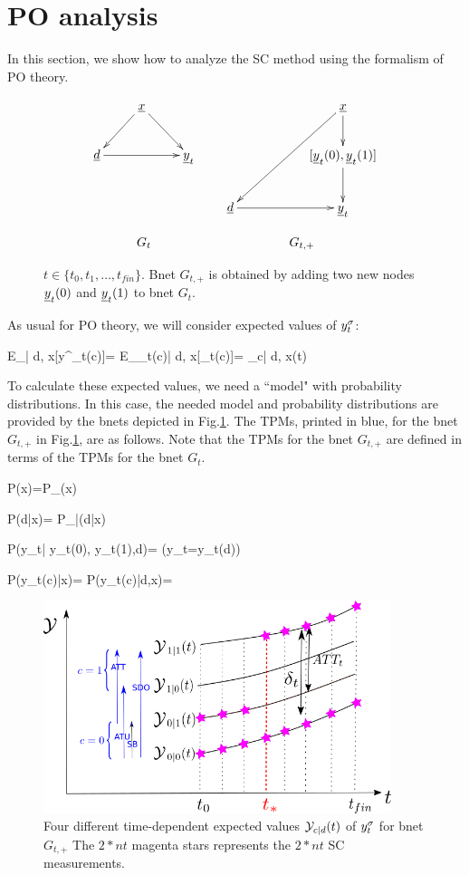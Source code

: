 \section{PO analysis}
In this section,
we show how
to analyze the
SC method
using the formalism of PO theory.



\begin{figure}[h!]
$$
\begin{array}{ccccc}
\xymatrix{
&\rvx\ar[dl]\ar[dr]
\\
\rvd\ar[rr]&&\rvy_t
}
&&
\xymatrix{
&&\rvx\ar[d]\ar[ddll]
\\
&&[\rvy_t(0), \rvy_t(1)]
\ar[d]
\\
\rvd\ar[rr]
&&\rvy_t
}
\\
\\
G_t&&G_{t, +}
\end{array}
$$
\caption{$t\in \{t_0, t_1, \ldots, 
t_{fin}\}$.
Bnet 
$G_{t,+}$
is obtained 
by adding
two new nodes
${\underline{y}}_t(0)$
and ${\underline{y}}_t(1)$ to bnet $G_t$.}
\label{fig-syn-con-G-+}
\end{figure}

As usual for PO theory,
we will consider
expected values of $y^\sigma_t$:


\beq
E_{\s| d, x}[y^\s_t(c)]=
 E_{\rvy_t(c)| d, x}[\rvy_t(c)]=
\caly_{c| d, x}(t)
\eeq

To calculate these
expected values, we need a ``model"
with probability 
distributions.
In this case,
the needed model and probability
distributions are
provided by the
bnets depicted in Fig.\ref{fig-syn-con-G-+}.
The TPMs,
printed in blue,
for the 
 bnet
$G_{t, +}$
in Fig.\ref{fig-syn-con-G-+},
are as follows.
Note
that the
TPMs for the bnet $G_{t, +}$
are defined in 
terms
of the TPMs for the bnet $G_t$.



\beq\color{blue}
P(x)=P_{\rvx}(x)
\eeq

\beq\color{blue}
P(d|x)= 
P_{\rvd|\rvx}(d|x)
\eeq
 
\beq\color{blue}
P(y_t| y_t(0), y_t(1),d)=
\indi(y_t=y_t(d))
\eeq

\beq\color{blue}
P(y_t(c)|x)=
P(y_t(c)|d,x)=
\eeq

\begin{figure}[h!]
\centering
\includegraphics[width=4in]
{syn-con/syn-con-bc.png}
\caption{Four different time-dependent
expected 
values ${\cal Y}_{c| d}(t)$ of $y^\sigma_t$
for bnet $G_{t, +}$
The $2*nt$ magenta  stars
represents the $2*nt$ SC measurements.} 
\label{fig-syn-con-bc}
\end{figure}




